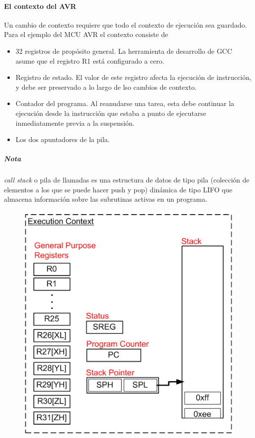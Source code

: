 \paragraph{El contexto del AVR}

Un cambio de contexto requiere que todo el contexto de ejecución sea guardado. Para el ejemplo del MCU AVR el contexto consiste de

\begin{itemize}
    \item 32 registros de propósito general. La herramienta de desarrollo de GCC asume que el registro R1 está configurado a cero.
    \item Registro de estado. El valor de este registro afecta la ejecución de instrucción, y debe ser preservado a lo largo de lso cambios de contexto.
    \item Contador del programa. Al reanudarse una tarea, esta debe continuar la ejecución desde la instrucción que estaba a punto de ejecutarse inmediatamente previa a la suspensión. 
    \item Los dos apuntadores de la pila.
\end{itemize}

\subparagraph{Nota} \textit{call stack} o pila de llamadas es una estructura de datos de tipo pila (colección de elementos a los que se puede hacer push y pop) dinámica de tipo LIFO que almacena información sobre las subrutinas activas en un programa.

\begin{figure}[H]
    \centering
    \includegraphics[scale=1]{RTOS/f5.PNG}
\end{figure}

